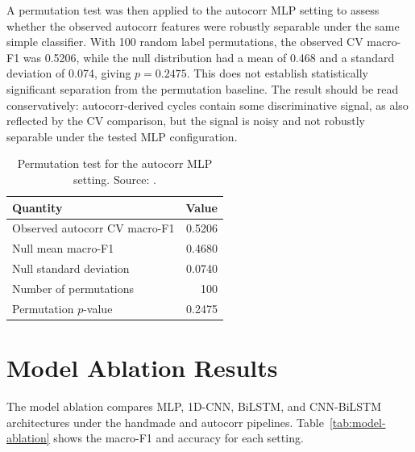 A permutation test was then applied to the autocorr MLP setting to assess
whether the observed autocorr features were robustly separable under the same
simple classifier. With 100 random label permutations, the observed CV macro-F1
was 0.5206, while the null distribution had a mean of 0.468 and a standard
deviation of 0.074, giving $p = 0.2475$. This does not establish statistically
significant separation from the permutation baseline. The result should be read
conservatively: autocorr-derived cycles contain some discriminative signal, as
also reflected by the CV comparison, but the signal is noisy and not robustly
separable under the tested MLP configuration.

\begin{table}[htbp]
\centering
\caption[Permutation test for the autocorr MLP setting. Source: \protect{}.]{Permutation test for the autocorr MLP setting. Source: .}
\label{tab:autocorr-permutation}
\small
\begin{tabularx}{\textwidth}{X r}
\toprule
\textbf{Quantity} & \textbf{Value} \\
\midrule
Observed autocorr CV macro-F1 & 0.5206 \\
Null mean macro-F1 & 0.4680 \\
Null standard deviation & 0.0740 \\
Number of permutations & 100 \\
Permutation $p$-value & 0.2475 \\
\bottomrule
\end{tabularx}
\end{table}


\section{Model Ablation Results}
\label{sec:model-ablation}

The model ablation compares MLP, 1D-CNN, BiLSTM, and CNN-BiLSTM architectures
under the handmade and autocorr pipelines. Table~\ref{tab:model-ablation}
shows the macro-F1 and accuracy for each setting.

